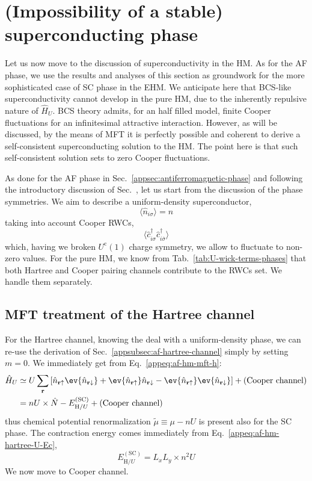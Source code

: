 \section{(Impossibility of a stable) superconducting phase}\label{appsec:superconducting-phase}

Let us now move to the discussion of superconductivity in the HM. As for the AF phase, we use the results and analyses of this section as groundwork for the more sophisticated case of SC phase in the EHM. We anticipate here that BCS-like superconductivity cannot develop in the pure HM, due to the inherently repulsive nature of $\hat H_U$. BCS theory admits, for an half filled model, finite Cooper fluctuations for an infinitesimal attractive interaction. However, as will be discussed, by the means of MFT it is perfectly possible and coherent to derive a self-consistent superconducting solution to the HM. The point here is that such self-consistent solution sets to zero Cooper fluctuations.

As done for the AF phase in Sec.~\ref{appsec:antiferromagnetic-phase} and following the introductory discussion of Sec.~\mref, let us start from the discussion of the phase symmetries. We aim to describe a uniform-density superconductor,
\[
	\langle \hat n_{i\sigma} \rangle = n
\]
taking into account Cooper RWCs,
\[
	\langle 
		\hat c_{i\sigma}^\dagger 
		\hat c_{i\overline{\sigma}}^\dagger 
	\rangle
\]
which, having we broken $U^\mathrm{c}(1)$ charge symmetry, we allow to fluctuate to non-zero values. For the pure HM, we know from Tab.~\ref{tab:U-wick-terms-phases} that both Hartree and Cooper pairing channels contribute to the RWCs set. We handle them separately.

\subsection{MFT treatment of the Hartree channel}\label{appsubsec:sc-hartree-channel}

{\color{tabred}
For the Hartree channel, knowing the deal with a uniform-density phase, we can re-use the derivation of Sec.~\ref{appsubsec:af-hartree-channel} simply by setting $m=0$. We immediately get from Eq.~\eqref{appeq:af-hm-mft-h}:
\begin{align}
	\hat H_U &\simeq U \sum_\mathbf{r} \left[
		\hat n_{\mathbf{r}\uparrow} \ev{\hat n_{\mathbf{r}\downarrow}} + \ev{\hat n_{\mathbf{r}\uparrow}} \hat n_{\mathbf{r}\downarrow} - \ev{\hat n_{\mathbf{r}\uparrow}} \ev{\hat n_{\mathbf{r}\downarrow}}
	\right] + \text{(Cooper channel)} \nonumber \\
	&= nU \times \hat N - E_{\mathrm{H}/U}^{(\mathrm{SC})} + \text{(Cooper channel)} \label{appeq:sc-hm-U-int-1}
\end{align}
thus chemical potential renormalization $\tilde{\mu} \equiv \mu - nU$ is present also for the SC phase. The contraction energy comes immediately from Eq.~\eqref{appeq:af-hm-hartree-U-Ec},
\begin{equation}\label{appeq:sc-hm-hartree-U-Ec}
	E_{\mathrm{H}/U}^{(\mathrm{SC})} = L_x L_y \times n^2 U
\end{equation}
We now move to Cooper channel.}

